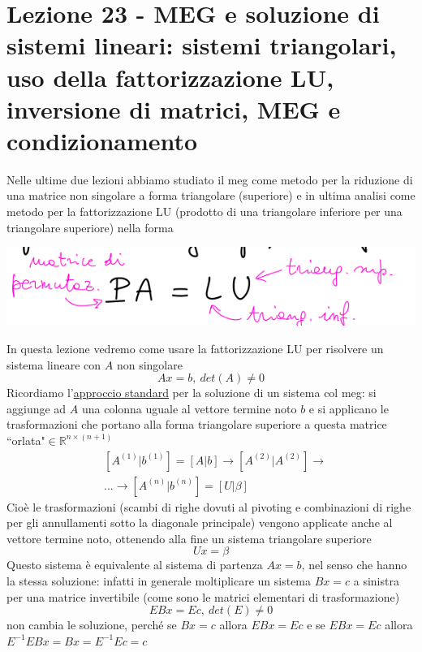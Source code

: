 \documentclass[12pt,a4paper]{article}
\begin{document}
\section[Lezione 23 - MEG e soluzioni di sistemi lineari]{Lezione 23 - MEG e soluzione di sistemi lineari: sistemi triangolari, uso della fattorizzazione LU, inversione di matrici, MEG e condizionamento}
Nelle ultime due lezioni abbiamo studiato il meg come metodo per la riduzione di una matrice non singolare a forma triangolare (superiore) e in ultima analisi come metodo per la fattorizzazione LU (prodotto di una triangolare inferiore per una triangolare superiore) nella forma
\begin{center}
    \includegraphics[scale=0.5]{pag1.png}
\end{center}
In questa lezione vedremo come usare la fattorizzazione LU per risolvere un sistema lineare con $A$ non singolare
\begin{equation*}
    Ax=b, \ det(A)\neq 0
\end{equation*}
Ricordiamo l'\uline{approccio standard} per la soluzione di un sistema col meg: si aggiunge ad $A$ una colonna uguale al vettore termine noto $b$ e si applicano le trasformazioni che portano alla forma triangolare superiore a questa matrice ``orlata"$\in \mathbb{R}^{n \times (n+1)}$
\begin{equation*}
    \begin{split}
        & [A^{(1)}|b^{(1)}] = [A|b]\rightarrow [A^{(2)}|A^{(2)}] \rightarrow \\
        & ... \rightarrow [A^{(n)}|b^{(n)}] = [U|\beta]
    \end{split}
\end{equation*}
Cioè le trasformazioni (scambi di righe dovuti al pivoting e combinazioni di righe per gli annullamenti sotto la diagonale principale) vengono applicate anche al vettore termine noto, ottenendo alla fine un sistema triangolare superiore
\begin{equation*}
    Ux=\beta
\end{equation*}
Questo sistema è equivalente al sistema di partenza $Ax=b$, nel senso che hanno la stessa soluzione: infatti in generale moltiplicare un sistema $Bx=c$ a sinistra per una matrice invertibile (come sono le matrici elementari di trasformazione)
\begin{equation*}
    EBx = Ec, \ det(E) \neq 0
\end{equation*}
non cambia le soluzione, perché se $Bx=c$ allora $EBx=Ec$ e se $EBx=Ec$ allora $E^{-1}EBx = Bx = E^{-1}Ec = c$
\end{document}
